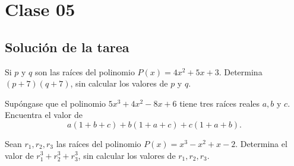 \section{Clase 05}\label{sec:clase-05}

    \subsection{Solución de la tarea}\label{subsec:solucion-tarea}
    \begin{section-problem}
        Si $p$ y $q$ son las raíces del polinomio $P(x) = 4x^2 + 5x + 3$.
        Determina $(p + 7)(q + 7)$, sin calcular los valores de $p$ y $q$.
    \end{section-problem}

    \begin{section-problem}
        Supóngase que el polinomio $5x^3 + 4x^2 - 8x + 6$ tiene tres raíces reales $a, b \mbox{ y } c$.
        Encuentra el valor de \[a(1 + b + c) + b(1 + a + c) + c(1 + a + b).\]
    \end{section-problem}

    \begin{section-problem}
        Sean $r_1, r_2, r_3$ las raíces del polinomio $P(x) = x^3 - x^2 + x - 2$.
        Determina el valor de $r^3_1 + r^3_2 + r^3_3$, sin calcular los valores de $r_1, r_2, r_3$.
    \end{section-problem}
